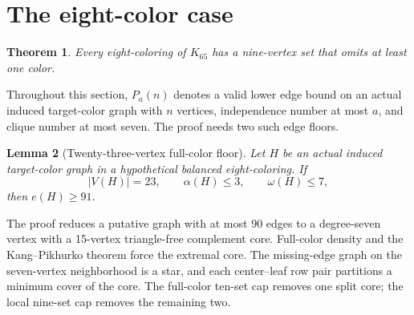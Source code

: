 \documentclass[11pt,reqno,a4paper]{amsart}
\newtheorem{theorem}{Theorem}[section]
\newtheorem{lemma}[theorem]{Lemma}
\theoremstyle{definition}
\theoremstyle{remark}
\begin{document}
\section{The eight-color case}\label{sec:r8}

\begin{theorem}\label{thm:r8}
Every eight-coloring of $K_{65}$ has a nine-vertex set that omits at least
one color.
\end{theorem}

Throughout this section, $P_a(n)$ denotes a valid lower edge bound on an
actual induced target-color graph with $n$ vertices, independence number
at most $a$, and clique number at most seven. The proof needs two such
edge floors.

\begin{lemma}[Twenty-three-vertex full-color floor]\label{lem:r8-p323}
Let $H$ be an actual induced target-color graph in a hypothetical balanced
eight-coloring. If
\[
  |V(H)|=23,
  \qquad\alpha(H)\leq3,
  \qquad\omega(H)\leq7,
\]
then $e(H)\geq91$.
\end{lemma}

The proof reduces a putative graph with at most 90 edges to a degree-seven
vertex with a 15-vertex triangle-free complement core. Full-color density
and the Kang--Pikhurko theorem force the extremal core. The missing-edge
graph on the seven-vertex neighborhood is a star, and each center--leaf
row pair partitions a minimum cover of the core. The full-color ten-set cap
removes one split core; the local nine-set cap removes the remaining two.
\end{document}
